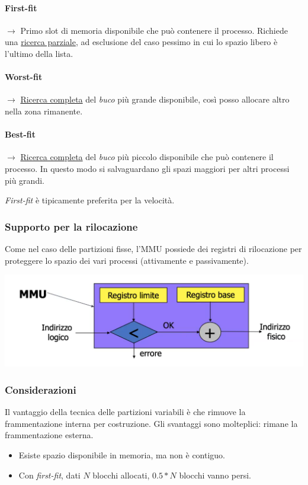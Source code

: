 \documentclass[a4paper,12pt, twoside]{report}
\begin{document}
\paragraph{First-fit} $\to$ Primo slot di memoria disponibile che pu\`o contenere il processo.
Richiede una \underline{ricerca parziale}, ad esclusione del caso pessimo in cui lo spazio 
libero \`e l'ultimo della lista.
\paragraph{Worst-fit} $\to$ \underline{Ricerca completa} del \emph{buco} pi\`u grande 
disponibile, cos\`i posso allocare altro nella zona rimanente. 
\paragraph{Best-fit} $\to$ \underline{Ricerca completa} del \emph{buco} pi\`u piccolo
disponibile che pu\`o contenere il processo. In questo modo si salvaguardano gli spazi 
maggiori per altri processi pi\`u grandi. 

\emph{First-fit} \`e tipicamente preferita per la velocit\`a. 

\subsubsection{Supporto per la rilocazione}

Come nel caso delle partizioni fisse, l'MMU possiede dei registri di rilocazione per 
proteggere lo spazio dei vari processi (attivamente e passivamente).

\begin{center}
    \includegraphics[scale=0.25]{mmuRelocation}
\end{center} 

\subsubsection{Considerazioni} 
Il vantaggio della tecnica delle partizioni variabili \`e che rimuove la frammentazione 
interna per costruzione. Gli svantaggi sono molteplici: rimane la frammentazione esterna. 
\begin{itemize}
    \item Esiste spazio disponibile in memoria, ma non \`e contiguo. 
    \item Con \emph{first-fit}, dati $N$ blocchi allocati, $0.5*N$ blocchi vanno persi. 
\end{itemize}
\end{document}
